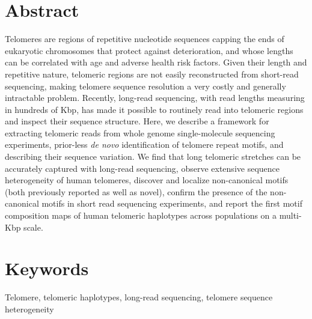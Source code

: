 \documentclass{article}
\begin{document}
\section*{Abstract} 
Telomeres are regions of repetitive nucleotide sequences capping the ends of eukaryotic chromosomes that protect against deterioration, and whose lengths can be correlated with age and adverse health risk factors.
Given their length and repetitive nature, telomeric regions are not easily reconstructed from short-read sequencing, making telomere sequence resolution a very costly and generally intractable problem.
Recently, long-read sequencing, with read lengths measuring in hundreds of Kbp, has made it possible to routinely read into telomeric regions and inspect their sequence structure.
Here, we describe a framework for
    extracting telomeric reads from whole genome single-molecule sequencing experiments,
    prior-less \textit{de novo} identification of telomere repeat motifs,
    and describing their sequence variation.
We find that
    long telomeric stretches can be accurately captured with long-read sequencing,
    observe extensive sequence heterogeneity of human telomeres,
    discover and localize non-canonical motifs (both previously reported as well as novel),
    confirm the presence of the non-canonical motifs in short read sequencing experiments,
    and report the first motif composition maps of human telomeric haplotypes across populations on a multi-Kbp scale.

\section*{Keywords} 
Telomere, telomeric haplotypes, long-read sequencing, telomere sequence heterogeneity

\pagebreak
\doublespacing
\end{document}
